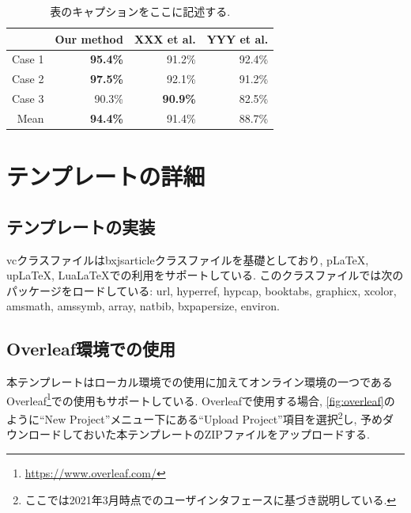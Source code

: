 \documentclass{vc}
\begin{document}
\begin{table}
  \centering
  \caption{表のキャプションをここに記述する.}
  \label{tab:accuracy}
  \begin{tabular}{@{}rrrr@{}}
    \toprule
    & Our method & XXX et al. & YYY et al. \\
    \midrule
    Case 1 & \textbf{95.4\%} &         91.2\%  & 92.4\% \\
    Case 2 & \textbf{97.5\%} &         92.1\%  & 91.2\% \\
    Case 3 &         90.3\%  & \textbf{90.9\%} & 82.5\% \\
    \midrule
    Mean   & \textbf{94.4\%} &         91.4\%  & 88.7\% \\
    \bottomrule
  \end{tabular}
\end{table}

\section{テンプレートの詳細}

\subsection{テンプレートの実装}

\textsf{vc}クラスファイルは\textsf{bxjsarticle}クラスファイルを基礎としており, pLaTeX, upLaTeX, LuaLaTeXでの利用をサポートしている.
このクラスファイルでは次のパッケージをロードしている:
\textsf{url},
\textsf{hyperref},
\textsf{hypcap},
\textsf{booktabs},
\textsf{graphicx},
\textsf{xcolor},
\textsf{amsmath},
\textsf{amssymb},
\textsf{array},
\textsf{natbib},
\textsf{bxpapersize},
\textsf{environ}.

\subsection{Overleaf環境での使用}

本テンプレートはローカル環境での使用に加えてオンライン環境の一つであるOverleaf\footnote{\url{https://www.overleaf.com/}}での使用もサポートしている.
Overleafで使用する場合, \autoref{fig:overleaf}のように``New Project''メニュー下にある``Upload Project''項目を選択\footnote{ここでは2021年3月時点でのユーザインタフェースに基づき説明している.}し, 予めダウンロードしておいた本テンプレートのZIPファイルをアップロードする.
\end{document}
